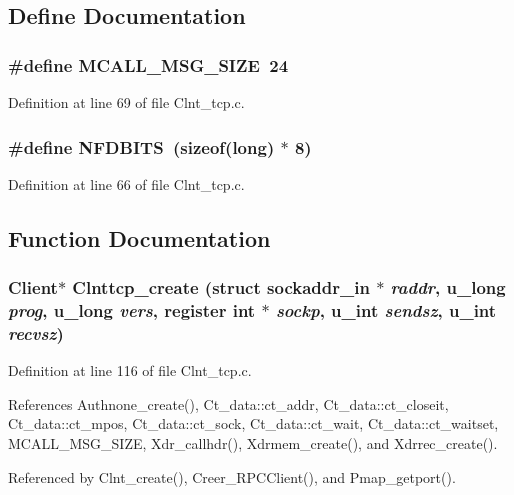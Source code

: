 \subsection{Define Documentation}
\subsubsection{\setlength{\rightskip}{0pt plus 5cm}\#define MCALL\_\-MSG\_\-SIZE\ 24}\label{Clnt__tcp_8c_a1}




Definition at line 69 of file Clnt\_\-tcp.c.
\subsubsection{\setlength{\rightskip}{0pt plus 5cm}\#define NFDBITS\ (sizeof(long) $\ast$ 8)}\label{Clnt__tcp_8c_a0}




Definition at line 66 of file Clnt\_\-tcp.c.

\subsection{Function Documentation}
\subsubsection{\setlength{\rightskip}{0pt plus 5cm}Client$\ast$ Clnttcp\_\-create (struct sockaddr\_\-in $\ast$ {\em raddr}, u\_\-long {\em prog}, u\_\-long {\em vers}, register int $\ast$ {\em sockp}, u\_\-int {\em sendsz}, u\_\-int {\em recvsz})}\label{Clnt__tcp_8c_a11}




Definition at line 116 of file Clnt\_\-tcp.c.

References Authnone\_\-create(), Ct\_\-data::ct\_\-addr, Ct\_\-data::ct\_\-closeit, Ct\_\-data::ct\_\-mpos, Ct\_\-data::ct\_\-sock, Ct\_\-data::ct\_\-wait, Ct\_\-data::ct\_\-waitset, MCALL\_\-MSG\_\-SIZE, Xdr\_\-callhdr(), Xdrmem\_\-create(), and Xdrrec\_\-create().

Referenced by Clnt\_\-create(), Creer\_\-RPCClient(), and Pmap\_\-getport().
